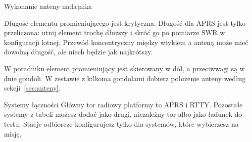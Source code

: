 \begin{podsekcja}{Wykonanie anteny nadajnika}
\begin{uwaga}Długość elementu promieniującego jest krytyczna. Długość dla APRS jest tylko przeliczona: utnij element trochę dłuższy i skróć go po pomiarze SWR w konfiguracji lotnej. Przewód koncentryczny między wtykiem a anteną może mieć dowolną długość, ale niech będzie jak najkrótszy.\end{uwaga}

W poradniku element promieniujący jest skierowany w dół, a przeciwwagi są w dnie gondoli. W zestawie z kilkoma gondolami dobierz położenie anteny według sekcji~\ref{sec:anteny}.
\end{podsekcja}

\clearpage
\begin{sekcja}{Systemy łączności}\label{sec:lacznosc-inne}
Główny tor radiowy platformy to APRS i RTTY. Pozostałe systemy z tabeli możesz dodać jako drugi, niezależny tor albo jako ładunek do testu. Stacje odbiorcze konfigurujesz tylko dla systemów, które wybierzesz na misję.


\end{sekcja}
